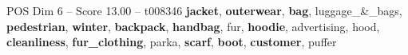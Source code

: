 \begin{textsample}{POS Dim 6 – Score 13.00 – t008346}  \label{ex:f6_pos_012}
\textbf{jacket}, \textbf{outerwear}, \textbf{bag}, luggage\_\&\_bags, \textbf{pedestrian}, \textbf{winter}, \textbf{backpack}, \textbf{handbag}, fur, \textbf{hoodie}, advertising, hood, \textbf{cleanliness}, \textbf{fur\_clothing}, parka, \textbf{scarf}, \textbf{boot}, \textbf{customer}, puffer

\end{textsample}
